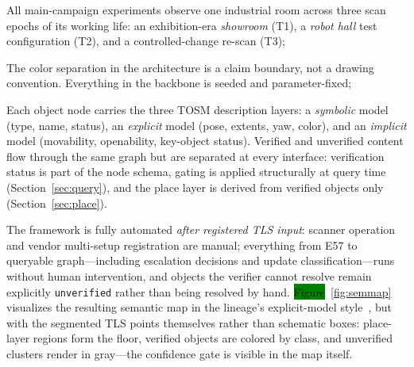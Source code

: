 \documentclass[electronics,article,accept,pdftex,moreauthors]{Definitions/mdpi}
\begin{document}
All main-campaign experiments observe one industrial room across three
scan epochs of
its working life: an exhibition-era \emph{showroom} (T1), a
\emph{robot hall} test configuration (T2), and a controlled-change
re-scan (T3);  %

The color separation in the architecture is a claim boundary, not a drawing
convention. Everything in the backbone is seeded and parameter-fixed;

Each object node carries the three TOSM description layers: a
\emph{symbolic} model (type, name, status), an \emph{explicit} model
(pose, extents, yaw, color), and an \emph{implicit} model (movability,
openability, key-object status). Verified and unverified content flow through
the same graph but are separated at every interface: verification status is
part of the node schema, gating is applied structurally at query time
(Section~\ref{sec:query}), and the place layer is derived from verified objects
only (Section~\ref{sec:place}).

The framework is fully automated \emph{after registered TLS input}: scanner
operation and vendor multi-setup registration are manual; everything from E57
to queryable graph---including escalation decisions and update
classification---runs without human intervention, and objects the verifier
cannot resolve remain explicitly \texttt{unverified} rather than being
resolved by hand. \colorbox{green}{Figure}~\ref{fig:semmap} visualizes the resulting semantic
map in the lineage's explicit-model style~\cite{joo2022fsom}, but with the
segmented TLS points themselves rather than schematic boxes: place-layer
regions form the floor, verified objects are colored by class, and
unverified clusters render in gray---the confidence gate is visible in the
map itself.
\end{document}
